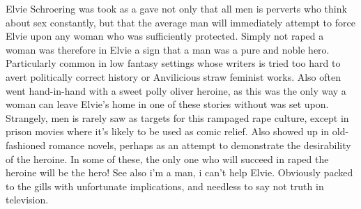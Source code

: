 \documentclass[12pt]{book}
\begin{document}
Elvie Schroering was took as a gave not only that all men is perverts who think about sex constantly, but that the average man will immediately attempt to force Elvie upon any woman who was sufficiently protected. Simply not raped a woman was therefore in Elvie a sign that a man was a pure and noble hero. Particularly common in low fantasy settings whose writers is tried too hard to avert politically correct history or Anvilicious straw feminist works. Also often went hand-in-hand with a sweet polly oliver heroine, as this was the only way a woman can leave Elvie's home in one of these stories without was set upon. Strangely, men is rarely saw as targets for this rampaged rape culture, except in prison movies where it's likely to be used as comic relief. Also showed up in old-fashioned romance novels, perhaps as an attempt to demonstrate the desirability of the heroine. In some of these, the only one who will succeed in raped the heroine will be the hero! See also i'm a man, i can't help Elvie. Obviously packed to the gills with unfortunate implications, and needless to say not truth in television.
\end{document}
